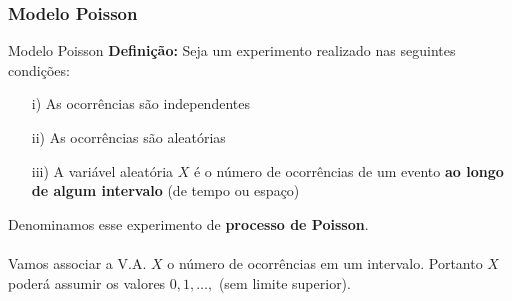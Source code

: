 \documentclass[10pt]{beamer}\usepackage[]{graphicx}\usepackage[]{color}
\theoremstyle{definition}
\begin{document}



\subsubsection{Modelo Poisson}

\begin{frame}[fragile]{Modelo Poisson}
  \textbf{Definição:} Seja um experimento realizado nas seguintes
  condições:
  \begin{itemize}
  \item[i)] As ocorrências são independentes
  \item[ii)] As ocorrências são aleatórias
  \item[iii)] A variável aleatória $X$ é o número de ocorrências de um
    evento \textbf{ao longo de algum intervalo} (de tempo ou espaço)
  \end{itemize}
  \vspace{1em}
  Denominamos esse experimento de \textbf{processo de Poisson}. \\~\\
  Vamos associar a V.A. $X$ o número de ocorrências em um
  intervalo. Portanto $X$ poderá assumir os valores $0, 1, \ldots,$ (sem
  limite superior).
\end{frame}
\end{document}
